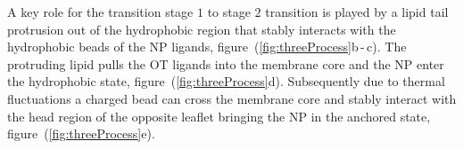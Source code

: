 A key role for the transition stage $1$ to stage $2$ transition is played by a lipid tail protrusion out of the 
hydrophobic region that stably interacts with the hydrophobic beads of the \ac{NP} ligands, 
figure~(\ref{fig:threeProcess}b\,-\,c). The protruding lipid pulls the \ac{OT} ligands into the membrane core and 
the \ac{NP} enter the hydrophobic state, figure~(\ref{fig:threeProcess}d). Subsequently due to thermal 
fluctuations a charged bead can cross the membrane core and stably interact with the head region of the opposite 
leaflet bringing the \ac{NP} in the anchored state, figure~(\ref{fig:threeProcess}e).
\begin{figure}[t]
	\centering
	\quad%
	\quad%
	\\%

\end{figure}
